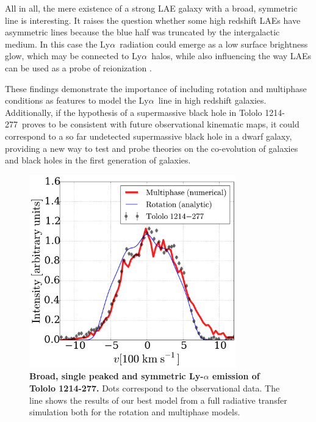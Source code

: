 \documentclass[a4paper, usenatbib, 12pt]{article}
\newcommand{\tol}{Tololo 1214-277}
\newcommand{\lya}{Ly$\alpha$}
\begin{document}
{All in all, the mere existence of a strong LAE galaxy with a broad,
symmetric line is interesting.
It raises the question whether some high redshift LAEs have asymmetric
lines because the blue half was truncated by the intergalactic medium.
In this case the \lya\ radiation could emerge as a low surface
brightness glow, which may be connected to \lya\ halos, while also
influencing the way LAEs can be used as a probe of reionization
\cite{2014PASA...31...40D}.  

These findings demonstrate the importance of including rotation and multiphase
conditions as features to model the \lya\ line in high redshift
galaxies.
Additionally, if the hypothesis of a supermassive black
hole in \tol\ proves to be consistent with future observational
kinematic maps, it could correspond to a so far undetected
supermassive black hole in a dwarf galaxy, providing a new way to test
and probe theories on the co-evolution of galaxies and black holes in
the first generation of galaxies.   

\begin{figure}
\begin{center}
\includegraphics[width=0.8\textwidth]{CLARA-TOL-main.pdf}
\caption{{\bf Broad, single peaked and symmetric Ly-$\alpha$ emission of \tol.}
  Dots correspond to the observational data. The line shows the results
of our best model from a full radiative transfer simulation both for
the rotation and multiphase models.} 
\end{center}
\end{figure}

{}


}
\end{document}
